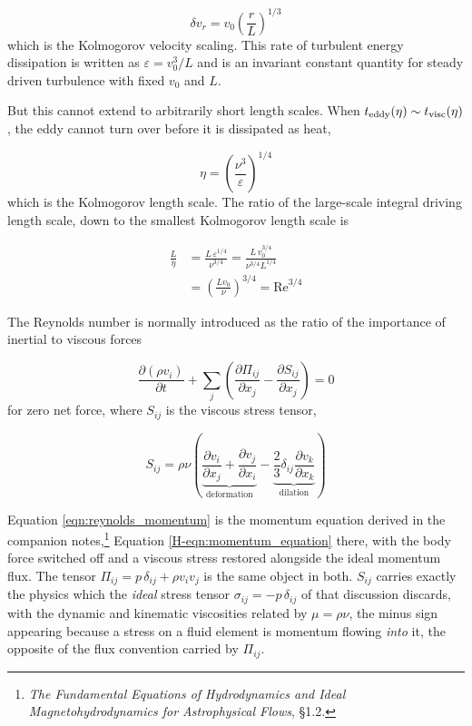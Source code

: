 \documentclass[notoc]{tufte-handout}
\begin{document}
\begin{equation}
\boxed{ \delta v_r = v_0 \left( \frac{r}{L} \right)^{1/3} }
\end{equation}
%
which is the Kolmogorov velocity scaling. This rate of turbulent energy dissipation is written as $\varepsilon = v_0^3 / L$ and is an invariant constant quantity for steady driven turbulence with fixed $v_0$ and $L$.

But this cannot extend to arbitrarily short length scales. When $t_{\rm eddy}(\eta) \sim t_{\rm visc}(\eta)$, the eddy cannot turn over before it is dissipated as heat,

\begin{equation}
\eta = \left( \frac{\nu^3}{\varepsilon} \right)^{1/4}
\end{equation}
%
which is the Kolmogorov length scale. The ratio of the large-scale integral driving length scale, down to the smallest Kolmogorov length scale is

\begin{align}
\frac{L}{\eta} & = \frac{L \, \varepsilon^{1/4}}{\nu^{3/4}} = \frac{L \, v_0^{3/4}}{\nu^{3/4} L^{1/4}} \\
& = \left( \frac{L v_0}{\nu} \right)^{3/4} = \mathrm{Re}^{3/4}
\label{eqn:Rescaling}
\end{align}

The Reynolds number is normally introduced as the ratio of the importance of inertial to viscous forces

\begin{equation}
\frac{\partial (\rho v_i)}{\partial t} + \sum_j \left( \frac{\partial \Pi_{ij}}{\partial x_j} - \frac{\partial S_{ij}}{\partial x_j} \right) = 0
\label{eqn:reynolds_momentum}
\end{equation}
%
for zero net force, where $S_{ij}$ is the viscous stress tensor,

\begin{equation}
S_{ij} = \rho \nu \left( \underbrace{\frac{\partial v_i}{\partial x_j} + \frac{\partial v_j}{\partial x_i}}_{\text{deformation}} - \underbrace{\frac{2}{3}\delta_{ij}\frac{\partial v_k}{\partial x_k}}_{\text{dilation}} \right)
\end{equation}

Equation \ref{eqn:reynolds_momentum} is the momentum equation derived in the companion notes,\footnote{{\it The Fundamental Equations of Hydrodynamics and Ideal Magnetohydrodynamics for Astrophysical Flows}, \S 1.2.} Equation \ref{H-eqn:momentum_equation} there, with the body force switched off and a viscous stress restored alongside the ideal momentum flux. The tensor $\Pi_{ij} = p\,\delta_{ij} + \rho v_i v_j$ is the same object in both. $S_{ij}$ carries exactly the physics which the {\it ideal} stress tensor $\sigma_{ij} = -p\,\delta_{ij}$ of that discussion discards, with the dynamic and kinematic viscosities related by $\mu = \rho\nu$, the minus sign appearing because a stress on a fluid element is momentum flowing {\it into} it, the opposite of the flux convention carried by $\Pi_{ij}$.
\end{document}
